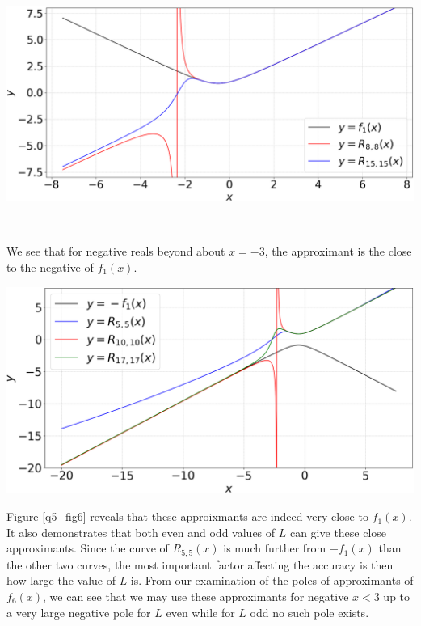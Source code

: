 \documentclass[12pt, a4paper]{article}
\begin{document}
\begin{minipage}{\textwidth}
	\centering
	\includegraphics[width=\linewidth]{q5_fig5}

	\vspace{-0.2cm}

	\label{q5_fig5}
\end{minipage}
\\

\vspace{0.3cm}

We see that for negative reals beyond about $x=-3$, the approximant is the close to the 
negative of $f_{1}(x)$.

\begin{minipage}{\textwidth}
	\centering
	\includegraphics[width=\linewidth]{q5_fig6}

	\vspace{-0.2cm}

	\label{q5_fig6}
\end{minipage}
\vspace{0.3cm}

Figure \ref{q5_fig6} reveals that these approixmants are indeed very close
to $f_{1}(x)$. It also demonstrates that both even and odd values of $L$
can give these close approximants. Since the curve of $R_{5,5}(x)$ is much 
further from $-f_{1}(x)$ than the other two curves, the most important
factor affecting the accuracy is then how large the value of $L$ is.
From our examination of the poles of approximants of $f_{6}(x)$, we can 
see that we may use these approximants for negative $x<3$ up to a very 
large negative pole for $L$ even while for $L$ odd no such pole exists.
\end{document}
